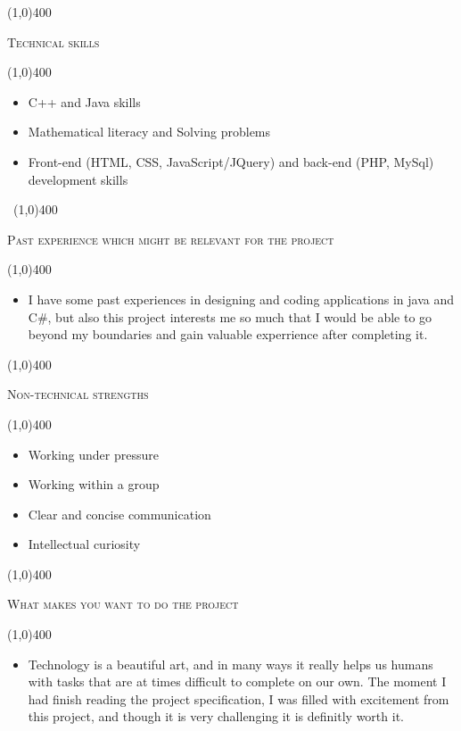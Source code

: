 \documentclass[12pt,a4paper]{report}
\begin{document}
	\begin{center}
	
	\line(1,0){400}\\
	{\scshape\large Technical skills\par}
	\line(1,0){400}\\
	\end{center}
	\begin{itemize}
        \item 
             C++ and Java skills
        \item 
            Mathematical literacy and Solving problems
        \item  
            Front-end (HTML, CSS, JavaScript/JQuery) and back-end (PHP, MySql) development skills 
	\end{itemize}
\newpage
\begin{center}
	\vspace*{-3cm}\
	\line(1,0){400}\\
	{\scshape\large Past experience which might be relevant for the project\par}
	\line(1,0){400}\\
	\end{center}
	\begin{itemize}
	\item 
		I have some past experiences in designing and coding applications in java and C#, but also this project interests me so much that I would be able to go beyond my boundaries and gain valuable experrience after completing it.
	\end{itemize}

	\begin{center}
	
	\line(1,0){400}\\
	{\scshape\large Non-technical strengths\par}
	\line(1,0){400}\\
	\end{center}
	\begin{itemize}
	\item 
		Working under pressure
	\item 
		Working within a group
	\item 
		Clear and concise communication
	\item 
		Intellectual curiosity
	\end{itemize}

\begin{center}
	
	\line(1,0){400}\\
	{\scshape\large What makes you want to do the project\par}
	\line(1,0){400}\\
	\end{center}
	\begin{itemize}
	\item 
		Technology is a beautiful art, and in many ways it really helps us humans with tasks that are at times difficult to complete on our own. The moment I had finish reading the project specification, I was filled with excitement from this project, and though it is very challenging it is definitly worth it.
	\end{itemize}
\end{document}
